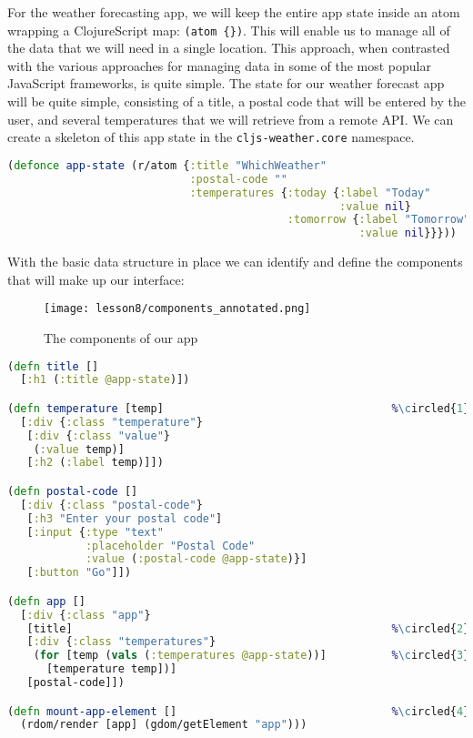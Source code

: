 \documentclass[10pt,twoside,openright]{memoir}
\newcommand*\circled[1]{\tikz[baseline=(char.base)]{
            \node[shape=circle,draw,inner sep=1pt] (char) {#1};}}
\begin{document}
For the weather forecasting app, we will keep the entire app state
inside an atom wrapping a ClojureScript map: \texttt{(atom\ \{\})}. This
will enable us to manage all of the data that we will need in a single
location. This approach, when contrasted with the various approaches for
managing data in some of the most popular JavaScript frameworks, is
quite simple. The state for our weather forecast app will be quite
simple, consisting of a title, a postal code that will be entered by the
user, and several temperatures that we will retrieve from a remote API.
We can create a skeleton of this app state in the
\texttt{cljs-weather.core} namespace.

\begin{lstlisting}[language=Clojure, caption={Initial application state}]
(defonce app-state (r/atom {:title "WhichWeather"
                            :postal-code ""
                            :temperatures {:today {:label "Today"
                                                   :value nil}
                                           :tomorrow {:label "Tomorrow"
                                                      :value nil}}}))
\end{lstlisting}


With the basic data structure in place we can identify and define the
components that will make up our interface:

\begin{figure}[H]
\caption{The components of our app}
\centering
\texttt{[image: lesson8/components\_annotated.png]}
\end{figure}

\begin{lstlisting}[language=Clojure, caption={Reagent components}]
(defn title []
  [:h1 (:title @app-state)])

(defn temperature [temp]                                   %\circled{1}%
  [:div {:class "temperature"}
   [:div {:class "value"}
    (:value temp)]
   [:h2 (:label temp)]])

(defn postal-code []
  [:div {:class "postal-code"}
   [:h3 "Enter your postal code"]
   [:input {:type "text"
            :placeholder "Postal Code"
            :value (:postal-code @app-state)}]
   [:button "Go"]])

(defn app []
  [:div {:class "app"}
   [title]                                                 %\circled{2}%
   [:div {:class "temperatures"}
    (for [temp (vals (:temperatures @app-state))]          %\circled{3}%
      [temperature temp])]
   [postal-code]])

(defn mount-app-element []                                 %\circled{4}%
  (rdom/render [app] (gdom/getElement "app")))
\end{lstlisting}
\end{document}
